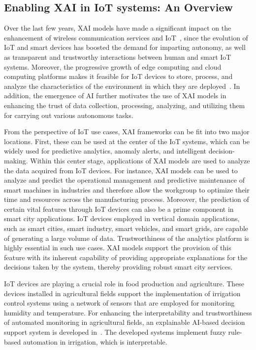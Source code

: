 \documentclass[journal]{IEEEtran}
\begin{document}
\subsection{Enabling XAI in IoT systems: An Overview}

Over the last few years, XAI models have made a significant impact on the enhancement of wireless communication services and IoT~\cite{9536411}, since the evolution of IoT and smart devices has boosted the demand for imparting autonomy, as well as transparent and trustworthy interactions between human and smart IoT systems. Moreover, the progressive growth of edge computing and cloud computing platforms makes it feasible for IoT devices to store, process, and analyze the characteristics of the environment in which they are deployed~\cite{pham2020survey}. In addition, the emergence of AI further motivates the use of XAI models in enhancing the trust of data collection, processing, analyzing, and utilizing them for carrying out various autonomous tasks.

From the perspective of IoT use cases, XAI frameworks can be fit into two major locations. First, these can be used at the center of the IoT systems, which can be widely used for predictive analytics, anomaly alerts, and intelligent decision-making. Within this center stage, applications of XAI models are used to analyze the data acquired from IoT devices. For instance, XAI models can be used to analyze and predict the operational management and predictive maintenance of smart machines in industries and therefore allow the workgroup to optimize their time and resources across the manufacturing process. Moreover, the prediction of certain vital features through IoT devices can also be a prime component in smart city applications. IoT devices employed in vertical domain applications, such as smart cities, smart industry, smart vehicles, and smart grids, are capable of generating a large volume of data. Trustworthiness of the analytics platform is highly essential in such use cases. XAI models support the provision of this feature with its inherent capability of providing appropriate explanations for the decisions taken by the system, thereby providing robust smart city services. 

IoT devices are playing a crucial role in food production and agriculture. These devices installed in agricultural fields support the implementation of irrigation control systems using a network of sensors that are employed for monitoring humidity and temperature. For enhancing the interpretability and trustworthiness of automated monitoring in agricultural fields, an explainable AI-based decision support system is developed in~\cite{tsakiridis2020versatile}. The developed systems implement fuzzy rule-based automation in irrigation, which is interpretable.
\end{document}
